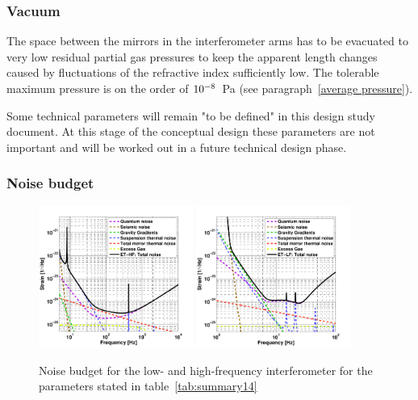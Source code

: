  \subsubsection{Vacuum}
 The space between the mirrors in the interferometer arms has to be evacuated to very low residual partial gas pressures to keep the apparent length changes caused by fluctuations of the refractive index sufficiently low. The tolerable maximum pressure is on the order of $\rm{10^{-8}}$~Pa (see paragraph~\ref{average pressure}).
 
 Some technical parameters will remain "to be defined" in this design study document. At this stage of the conceptual design these parameters are not important and will be worked out in a future technical design phase.

\subsubsection{\label{Noisebudget}Noise budget}

\begin{figure}
  \begin{center}
    \includegraphics[width=0.45\textwidth]{Sec_Introduction/ETD_HF3.pdf}
%  
    \includegraphics[width=0.45\textwidth]{Sec_Introduction/ETD_LF3.pdf}
    \caption{Noise budget for the low- and high-frequency interferometer for the parameters stated in table~\ref{tab:summary14}}
    \label{fig:noise_budget}
    \vspace{-0.7cm}
  \end{center}
\end{figure}

